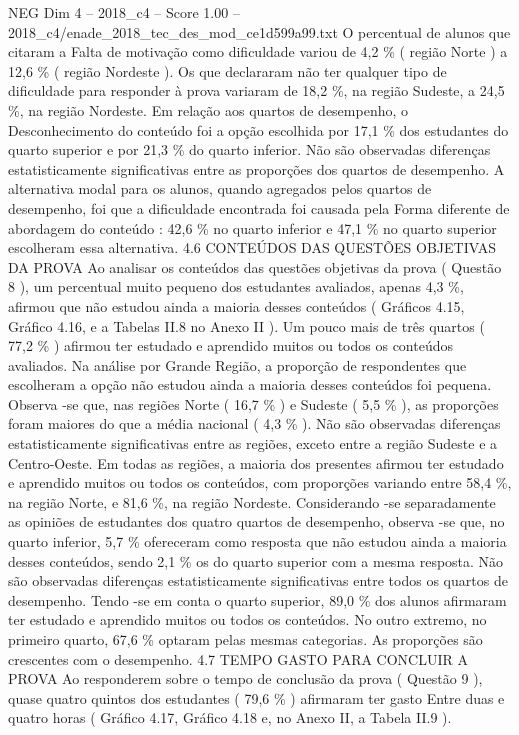 \begin{textsample}{NEG Dim 4 – 2018\_c4 – Score 1.00 – 2018\_c4/enade\_2018\_tec\_des\_mod\_ce1d599a99.txt}
O percentual de alunos que citaram a Falta de motivação como dificuldade variou de 4,2 \% ( região Norte ) a 12,6 \% ( região Nordeste ).
Os que declararam não ter qualquer tipo de dificuldade para responder à prova variaram de 18,2 \%, na região Sudeste, a 24,5 \%, na região Nordeste.
Em relação aos quartos de desempenho, o Desconhecimento do conteúdo foi a opção escolhida por 17,1 \% dos estudantes do quarto superior e por 21,3 \% do quarto inferior.
Não são observadas diferenças estatisticamente significativas entre as proporções dos quartos de desempenho.
A alternativa modal para os alunos, quando agregados pelos quartos de desempenho, foi que a dificuldade encontrada foi causada pela Forma diferente de abordagem do conteúdo : 42,6 \% no quarto inferior e 47,1 \% no quarto superior escolheram essa alternativa. 4.6 CONTEÚDOS DAS QUESTÕES OBJETIVAS DA PROVA Ao analisar os conteúdos das questões objetivas da prova ( Questão 8 ), um percentual muito pequeno dos estudantes avaliados, apenas 4,3 \%, afirmou que não estudou ainda a maioria desses conteúdos ( Gráficos 4.15, Gráfico 4.16, e a Tabelas II.8 no Anexo II ).
Um pouco mais de três quartos ( 77,2 \% ) afirmou ter estudado e aprendido muitos ou todos os conteúdos avaliados.
Na análise por Grande Região, a proporção de respondentes que escolheram a opção não estudou ainda a maioria desses conteúdos foi pequena.
Observa -se que, nas regiões Norte ( 16,7 \% ) e Sudeste ( 5,5 \% ), as proporções foram maiores do que a média nacional ( 4,3 \% ).
Não são observadas diferenças estatisticamente significativas entre as regiões, exceto entre a região Sudeste e a Centro-Oeste.
Em todas as regiões, a maioria dos presentes afirmou ter estudado e aprendido muitos ou todos os conteúdos, com proporções variando entre 58,4 \%, na região Norte, e 81,6 \%, na região Nordeste.
Considerando -se separadamente as opiniões de estudantes dos quatro quartos de desempenho, observa -se que, no quarto inferior, 5,7 \% ofereceram como resposta que não estudou ainda a maioria desses conteúdos, sendo 2,1 \% os do quarto superior com a mesma resposta.
Não são observadas diferenças estatisticamente significativas entre todos os quartos de desempenho.
Tendo -se em conta o quarto superior, 89,0 \% dos alunos afirmaram ter estudado e aprendido muitos ou todos os conteúdos.
No outro extremo, no primeiro quarto, 67,6 \% optaram pelas mesmas categorias.
As proporções são crescentes com o desempenho. 4.7 TEMPO GASTO PARA CONCLUIR A PROVA Ao responderem sobre o tempo de conclusão da prova ( Questão 9 ), quase quatro quintos dos estudantes ( 79,6 \% ) afirmaram ter gasto Entre duas e quatro horas ( Gráfico 4.17, Gráfico 4.18 e, no Anexo II, a Tabela II.9 ).

\end{textsample}
